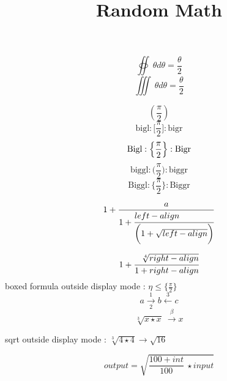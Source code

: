 \documentclass{article}
\title{Random Math}
\begin{document}
\maketitle
$$\oiint ~\theta{}d\theta = \frac{\theta}{2}$$
$$\iiint ~\theta{}d\theta = \frac{\theta}{2}$$

$$(\frac{\pi}{2})$$
$$\textrm{bigl} : \bigl[ \frac{\pi}{2} \bigr] : \textrm{bigr}$$
$$\textrm{Bigl} : \Bigl\{ \frac{\pi}{2}\Bigr\} : \textrm{Bigr}$$
$$\textrm{biggl} : \biggl( \frac{\pi}{2}\biggr) : \textrm{biggr}$$
$$\textrm{Biggl} : \Biggl\{ \frac{\pi}{2} \Biggr\} : \textrm{Biggr}$$

$$1+\frac{a}{1+\cfrac[l]{left-align}{\biggl(1 + \sqrt{left-align}\biggr)}}$$

$$1+\cfrac[r]{\sqrt[4]{right-align}}{1 + right-align}$$
boxed formula outside display mode : $\boxed{\eta \leq \bigl\{\frac{\pi}{2}\bigr\}}$
$$a \xrightarrow[2]{1} b \xleftarrow{3} c$$
$$\sqrt[3]{x \star x}~\xrightarrow{\beta} x$$

sqrt outside display mode : $\sqrt[3]{4 \star 4}\rightarrow\sqrt{16}$

$$output = \sqrt{\frac{100+int}{100} ~\star input}$$

\end{document}
